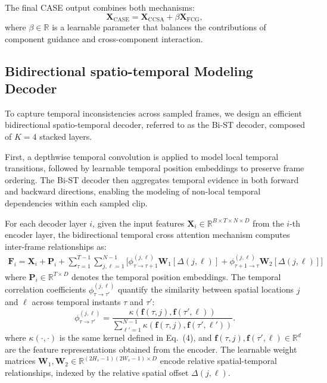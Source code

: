 \documentclass[runningheads]{llncs}
\begin{document}
The final CASE output combines both mechanisms:
\begin{equation}
\mathbf{X}_{\text{CASE}} = \mathbf{X}_{\text{CCSA}} + \beta \mathbf{X}_{\text{FCG}} ,
\end{equation}
where $\beta \in \mathbb{R}$ is a learnable parameter that balances the contributions of component guidance and cross-component interaction.

\subsection{Bidirectional spatio-temporal Modeling Decoder}
To capture temporal inconsistencies across sampled frames, we design an efficient bidirectional spatio-temporal decoder, referred to as the Bi-ST decoder, composed of $K=4$ stacked layers.

First, a depthwise temporal convolution is applied to model local temporal transitions, followed by learnable temporal position embeddings to preserve frame ordering. The Bi-ST decoder then aggregates temporal evidence in both forward and backward directions, enabling the modeling of non-local temporal dependencies within each sampled clip.

For each decoder layer $i$, given the input features $\mathbf{X}_i \in \mathbb{R}^{B \times T \times N \times D}$ from the $i$-th encoder layer, the bidirectional temporal cross attention mechanism computes inter-frame relationships as:
\begin{equation}
\begin{split}
\mathbf{F}_i = \mathbf{X}_i + \mathbf{P}_i + \sum_{\tau=1}^{T-1} \sum_{j,\ell=1}^{N-1} \Big[ \phi^{(j,\ell)}_{\tau \rightarrow \tau+1} \mathbf{W}_1[\Delta(j,\ell)] 
+ \phi^{(j,\ell)}_{\tau+1 \rightarrow \tau} \mathbf{W}_2[\Delta(j,\ell)] \Big]
\end{split}
\end{equation}
where $\mathbf{P}_i \in \mathbb{R}^{T \times D}$ denotes the temporal position embeddings. The temporal correlation coefficients $\phi_{\tau \rightarrow \tau'}^{(j,\ell)}$ quantify the similarity between spatial locations $j$ and $\ell$ across temporal instants $\tau$ and $\tau'$:
\begin{equation}
\phi_{\tau \rightarrow \tau'}^{(j,\ell)} = \frac{\kappa(\mathbf{f}(\tau, j), \mathbf{f}(\tau', \ell))}{\sum_{\ell'=1}^{N-1} \kappa(\mathbf{f}(\tau, j), \mathbf{f}(\tau', \ell'))} .
\end{equation}
where $\kappa(\cdot,\cdot)$ is the same kernel defined in Eq.~(4), and $\mathbf{f}(\tau, j), \mathbf{f}(\tau', \ell) \in \mathbb{R}^d$ are the feature representations obtained from the encoder. The learnable weight matrices $\mathbf{W}_1, \mathbf{W}_2 \in \mathbb{R}^{(2H_s-1)(2W_s-1) \times D}$ encode relative spatial-temporal relationships, indexed by the relative spatial offset $\Delta(j,\ell)$.
\end{document}
